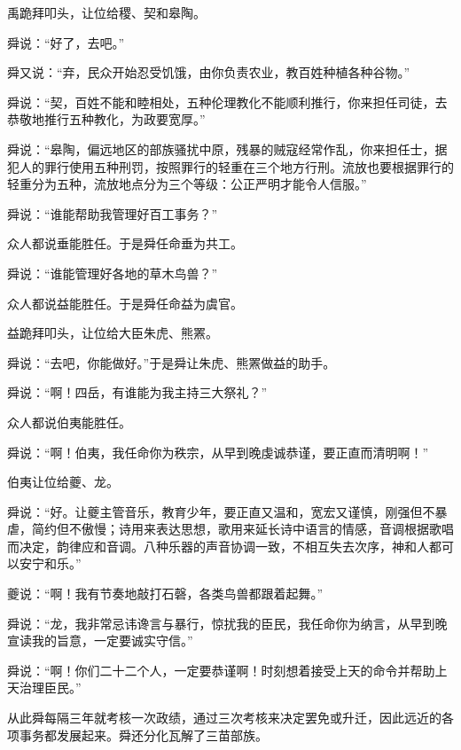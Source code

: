 \documentclass[12pt,UTF8]{ctexbook}
\begin{document}
禹跪拜叩头，让位给稷、契和皋陶。

舜说：“好了，去吧。”

舜又说：“弃，民众开始忍受饥饿，由你负责农业，教百姓种植各种谷物。”

舜说：“契，百姓不能和睦相处，五种伦理教化不能顺利推行，你来担任司徒，去恭敬地推行五种教化，为政要宽厚。”

舜说：“皋陶，偏远地区的部族骚扰中原，残暴的贼寇经常作乱，你来担任士，据犯人的罪行使用五种刑罚，按照罪行的轻重在三个地方行刑。流放也要根据罪行的轻重分为五种，流放地点分为三个等级：公正严明才能令人信服。”

舜说：“谁能帮助我管理好百工事务？”

众人都说垂能胜任。于是舜任命垂为共工。

舜说：“谁能管理好各地的草木鸟兽？”

众人都说益能胜任。于是舜任命益为虞官。

益跪拜叩头，让位给大臣朱虎、熊罴。

舜说：“去吧，你能做好。”于是舜让朱虎、熊罴做益的助手。

舜说：“啊！四岳，有谁能为我主持三大祭礼？”

众人都说伯夷能胜任。

舜说：“啊！伯夷，我任命你为秩宗，从早到晚虔诚恭谨，要正直而清明啊！”

伯夷让位给夔、龙。

舜说：“好。让夔主管音乐，教育少年，要正直又温和，宽宏又谨慎，刚强但不暴虐，简约但不傲慢；诗用来表达思想，歌用来延长诗中语言的情感，音调根据歌唱而决定，韵律应和音调。八种乐器的声音协调一致，不相互失去次序，神和人都可以安宁和乐。”

夔说：“啊！我有节奏地敲打石磬，各类鸟兽都跟着起舞。”

舜说：“龙，我非常忌讳谗言与暴行，惊扰我的臣民，我任命你为纳言，从早到晚宣读我的旨意，一定要诚实守信。”

舜说：“啊！你们二十二个人，一定要恭谨啊！时刻想着接受上天的命令并帮助上天治理臣民。”

从此舜每隔三年就考核一次政绩，通过三次考核来决定罢免或升迁，因此远近的各项事务都发展起来。舜还分化瓦解了三苗部族。
\end{document}
